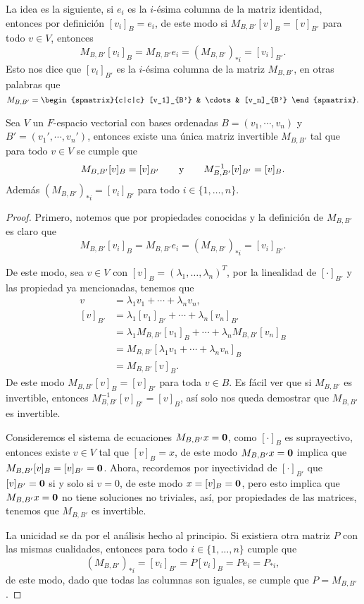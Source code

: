 La idea es la siguiente, si $e_i$ es la $i$-ésima columna de la matriz identidad, entonces por definición $[v_i]_B = e_i$, de este modo si $M_{B,B'} [v]_B = [v]_{B'}$ para todo $v \in V$, entonces
  \[ M_{B,B'} [v_i]_B = M_{B,B'} e_i = (M_{B,B'})_{*i} = [v_i]_{B'}. \]
Esto nos dice que $[v_i]_{B'}$ es la $i$-ésima columna de la matriz $M_{B,B'}$, en otras palabras que
  \[ M_{B,B'} = \begin{spmatrix}{c|c|c}  [v_1]_{B'} & \cdots & [v_n]_{B'}  \end{spmatrix}. \]

\begin{teor}
  Sea $V$ un $F$-espacio vectorial con bases ordenadas $B = (v_1,\cdots,v_n)$ y $B' = (v_1',\cdots,v_n')$, entonces existe una única matriz invertible $M_{B,B'}$ tal que para todo $v \in V$ se cumple que
    \[ M_{B,B'}[v]_B = [v]_{B'} \qquad\text{y}\qquad M_{B,B'}^{-1}[v]_{B'} = [v]_B. \]
  Además $(M_{B,B'})_{*i} = [v_i]_{B'}$ para todo $i \in \{1,\ldots,n\}$.
\end{teor}
\begin{proof}
  Primero, notemos que por propiedades conocidas y la definición de $M_{B,B'}$ es claro que 
    \[ M_{B,B'}[v_i]_B = M_{B,B'} e_i =  (M_{B,B'})_{*i} = [v_i]_{B'}. \]

  De este modo, sea $v \in V$ con $[v]_B = (\lambda_1,\ldots,\lambda_n)^T$, por la linealidad de $[\cdot]_{B'}$ y las propiedad ya mencionadas, tenemos que
    \begin{align*}
      v        &= \lambda_1 v_1 + \cdots + \lambda_n v_n, \\
      [v]_{B'} &= \lambda_1 [v_1]_{B'} + \cdots + \lambda_n [v_n]_{B'} \\
               &= \lambda_1 M_{B,B'}[v_1]_B + \cdots + \lambda_n M_{B,B'}[v_n]_B \\
               &= M_{B,B'} [\lambda_1 v_1 + \cdots + \lambda_n v_n ]_B \\
               &= M_{B,B'} [ v ]_B.
    \end{align*}
  De este modo $M_{B,B'}[v]_B = [v]_{B'}$ para toda $v \in B$. Es fácil ver que si $M_{B,B'}$ es invertible, entonces $M_{B,B'}^{-1}[v]_{B'} = [v]_B$, así solo nos queda demostrar que $M_{B,B'}$ es invertible.
  
  Consideremos el sistema de ecuaciones $M_{B,B'}x = \mathbf{0}$, como $[\cdot]_B$ es suprayectivo, entonces existe $v \in V$ tal que $[v]_B = x$, de este modo $M_{B,B'}x = \mathbf{0}$ implica que $M_{B,B'}[v]_B = [v]_{B'} = \mathbf{0}$. Ahora, recordemos por inyectividad de $[\cdot]_{B'}$ que $[v]_{B'} = \mathbf{0}$ si y solo si $v = 0$, de este modo $x = [v]_{B} = \mathbf{0}$, pero esto implica que $M_{B,B'}x = \mathbf{0}$ no tiene soluciones no triviales, así, por propiedades de las matrices, tenemos que $M_{B,B'}$ es invertible.

  La unicidad se da por el análisis hecho al principio. Si existiera otra matriz $P$ con las mismas cualidades, entonces para todo $i \in \{1,\ldots, n\}$ cumple que
  \[ (M_{B,B'})_{*i} = [v_i]_{B'} = P[v_i]_{B} = Pe_i = P_{*i},\]
  de este modo, dado que todas las columnas son iguales, se cumple que $P = M_{B,B'}$.
\end{proof}

